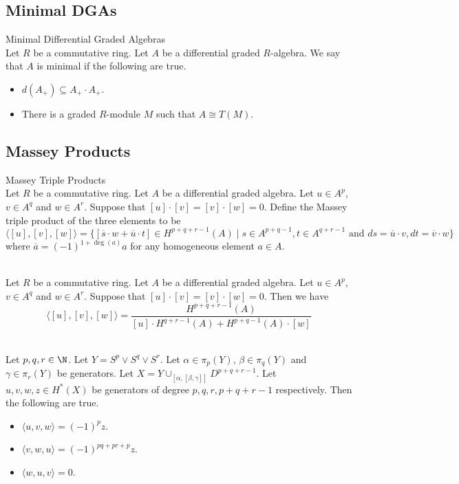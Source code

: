 \documentclass[a4paper]{article}
\begin{document}
\subsection{Minimal DGAs}
\begin{defn}{Minimal Differential Graded Algebras}{}\\
Let $R$ be a commutative ring. Let $A$ be a differential graded $R$-algebra. We say that $A$ is minimal if the following are true. 
\begin{itemize}
\item $d(A_+)\subseteq A_+\cdot A_+$. 
\item There is a graded $R$-module $M$ such that $A\cong T(M)$. 
\end{itemize}
\end{defn}

\subsection{Massey Products}
\begin{defn}{Massey Triple Products}{}\\
Let $R$ be a commutative ring. Let $A$ be a differential graded algebra. Let $u\in A^p$, $v\in A^q$ and $w\in A^r$. Suppose that $[u]\cdot[v]=[v]\cdot[w]=0$. Define the Massey triple product of the three elements to be $$\langle[u],[v],[w]\rangle=\{[\overline{s}\cdot w+\overline{u}\cdot t]\in H^{p+q+r-1}(A)\;|\;s\in A^{p+q-1},t\in A^{q+r-1}\text{ and }ds=\overline{u}\cdot v,dt=\overline{v}\cdot w\}$$ where $\overline{a}=(-1)^{1+\deg(a)}a$ for any homogeneous element $a\in A$. 
\end{defn}

\begin{lmm}{}{}\\
Let $R$ be a commutative ring. Let $A$ be a differential graded algebra. Let $u\in A^p$, $v\in A^q$ and $w\in A^r$. Suppose that $[u]\cdot[v]=[v]\cdot[w]=0$. Then we have $$\langle[u],[v],[w]\rangle=\frac{H^{p+q+r-1}(A)}{[u]\cdot H^{q+r-1}(A)+H^{p+q-1}(A)\cdot[w]}$$
\end{lmm}

\begin{prp}{}{}\\
Let $p,q,r\in\N$. Let $Y=S^p\vee S^q\vee S^r$. Let $\alpha\in\pi_p(Y)$, $\beta\in\pi_q(Y)$ and $\gamma\in\pi_r(Y)$ be generators. Let $X=Y\cup_{[\alpha,[\beta,\gamma]]}D^{p+q+r-1}$. Let $u,v,w,z\in H^\ast(X)$ be generators of degree $p,q,r,p+q+r-1$ respectively. Then the following are true. 
\begin{itemize}
\item $\langle u,v,w\rangle=(-1)^pz$. 
\item $\langle v,w,u\rangle=(-1)^{pq+pr+p}z$. 
\item $\langle w,u,v\rangle=0$. 
\end{itemize}
\end{prp}
\end{document}
